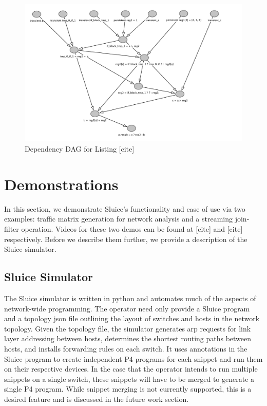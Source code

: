 \documentclass[12pt, oneside]{article}
\begin{document}
\begin{figure}
\centering
\includegraphics[width=175mm,scale=1]{figures/dependency_dag.pdf}
\caption{Dependency DAG for Listing [cite]}
\end{figure}



\newpage
\section{Demonstrations} 
In this section, we demonstrate Sluice's functionality and ease of use via two examples: traffic matrix generation for network analysis and a streaming join-filter operation. Videos for these two demos can be found at [cite] and [cite] respectively. Before we describe them further, we provide a description of the Sluice simulator.

\subsection{Sluice Simulator}
The Sluice simulator is written in python and automates much of the aspects of network-wide programming. The operator need only provide a Sluice program and a topology json file outlining the layout of switches and hosts in the network topology. Given the topology file, the simulator generates arp requests for link layer addressing between hosts, determines the shortest routing paths between hosts, and installs forwarding rules on each switch. It uses annotations in the Sluice program to create independent P4 programs for each snippet and run them on their respective devices. In the case that the operator intends to run multiple snippets on a single switch, these snippets will have to be merged to generate a single P4 program. While snippet merging is not currently supported, this is a desired feature and is discussed in the future work section. 
\end{document}
